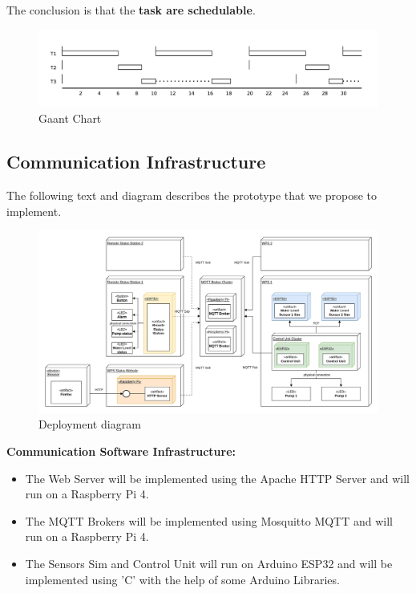\documentclass[11pt]{article}
\begin{document}
The conclusion is that the \textbf{task are schedulable}.

\begin{figure}[H]
  \centering
  \includegraphics[width=\linewidth]{../diagrams/rt-grant-chart.jpg}
  \caption{Gaant Chart}
  \label{fig:Gaant Chart}
\end{figure}


\newpage
\subsection{Communication Infrastructure}

The following text and diagram describes the prototype that we propose to implement. 

\begin{figure}[H]
  \centering
  \includegraphics[width=\linewidth]{../diagrams/deployment-diagram-WPS.jpg}
  \caption{Deployment diagram}
  \label{fig:Deployment Diagram}
\end{figure}

\textbf{Communication Software Infrastructure:}

\begin{itemize}
	\item The Web Server will be implemented using the Apache HTTP Server and will run on a Raspberry Pi 4.
	\item The MQTT Brokers will be implemented using Mosquitto MQTT and will run on a Raspberry Pi 4.
	\item The Sensors Sim and Control Unit will run on Arduino ESP32 and will be implemented using 'C' with the help of some Arduino Libraries. 
\end{itemize}
\end{document}
